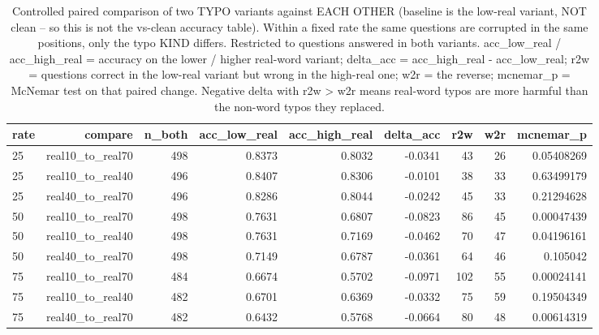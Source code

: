 \documentclass[11pt]{article}
\begin{document}
\begin{table}[H]
\centering
\caption{Controlled paired comparison of two TYPO variants against EACH OTHER (baseline is the low-real variant, NOT clean -- so this is not the vs-clean accuracy table). Within a fixed rate the same questions are corrupted in the same positions, only the typo KIND differs. Restricted to questions answered in both variants. acc\_low\_real / acc\_high\_real = accuracy on the lower / higher real-word variant; delta\_acc = acc\_high\_real - acc\_low\_real; r2w = questions correct in the low-real variant but wrong in the high-real one; w2r = the reverse; mcnemar\_p = McNemar test on that paired change. Negative delta with r2w > w2r means real-word typos are more harmful than the non-word typos they replaced.}
\small
\begin{adjustbox}{max width=\textwidth}
\begin{tabular}{lrrrrrrrr}
\toprule
\textbf{rate} & \textbf{compare} & \textbf{n\_both} & \textbf{acc\_low\_real} & \textbf{acc\_high\_real} & \textbf{delta\_acc} & \textbf{r2w} & \textbf{w2r} & \textbf{mcnemar\_p} \\
\midrule
25 & real10\_to\_real70 & 498 & 0.8373 & 0.8032 & -0.0341 & 43 & 26 & 0.05408269 \\
25 & real10\_to\_real40 & 496 & 0.8407 & 0.8306 & -0.0101 & 38 & 33 & 0.63499179 \\
25 & real40\_to\_real70 & 496 & 0.8286 & 0.8044 & -0.0242 & 45 & 33 & 0.21294628 \\
50 & real10\_to\_real70 & 498 & 0.7631 & 0.6807 & -0.0823 & 86 & 45 & 0.00047439 \\
50 & real10\_to\_real40 & 498 & 0.7631 & 0.7169 & -0.0462 & 70 & 47 & 0.04196161 \\
50 & real40\_to\_real70 & 498 & 0.7149 & 0.6787 & -0.0361 & 64 & 46 & 0.105042 \\
75 & real10\_to\_real70 & 484 & 0.6674 & 0.5702 & -0.0971 & 102 & 55 & 0.00024141 \\
75 & real10\_to\_real40 & 482 & 0.6701 & 0.6369 & -0.0332 & 75 & 59 & 0.19504349 \\
75 & real40\_to\_real70 & 482 & 0.6432 & 0.5768 & -0.0664 & 80 & 48 & 0.00614319 \\
\bottomrule
\end{tabular}
\end{adjustbox}
\end{table}
\end{document}
